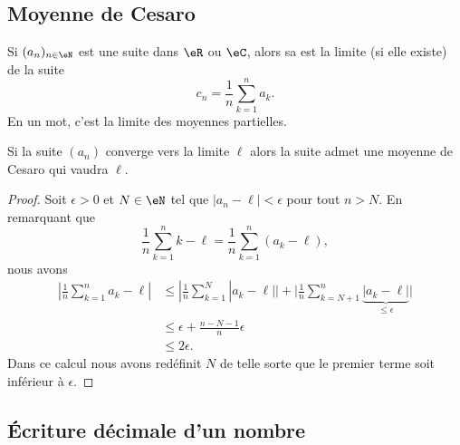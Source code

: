 \subsection{Moyenne de Cesaro}

Si \( (a_n)_{n\in \eN} \) est une suite dans \( \eR\) ou \( \eC\), alors sa  est la limite (si elle existe) de la suite
\begin{equation}
    c_n=\frac{1}{ n }\sum_{k=1}^na_k.
\end{equation}
En un mot, c'est la limite des moyennes partielles.

\begin{lemma}       \label{LemyGjMqM}
    Si la suite \( (a_n)\) converge vers la limite \( \ell\) alors la suite admet une moyenne de Cesaro qui vaudra \( \ell\).
\end{lemma}

\begin{proof}
    Soit \( \epsilon>0\) et \( N\in \eN\) tel que \( | a_n-\ell |<\epsilon\) pour tout \( n>N\). En remarquant que
    \begin{equation}
        \frac{1}{ n }\sum_{k=1}^nk-\ell=\frac{1}{ n }\sum_{k=1}^n(a_k-\ell),
    \end{equation}
    nous avons
    \begin{subequations}
        \begin{align}
            | \frac{1}{ n }\sum_{k=1}^na_k-\ell |&\leq| \frac{1}{ n }\sum_{k=1}^N| a_k-\ell | |+\big| \frac{1}{ n }\sum_{k=N+1}^n\underbrace{| a_k-\ell |}_{\leq \epsilon} \big|\\
            &\leq \epsilon+\frac{ n-N-1 }{ n }\epsilon\\
            &\leq 2\epsilon.
        \end{align}
    \end{subequations}
    Dans ce calcul nous avons redéfinit \( N\) de telle sorte que le premier terme soit inférieur à \( \epsilon\).
\end{proof}

\subsection{Écriture décimale d'un nombre}


